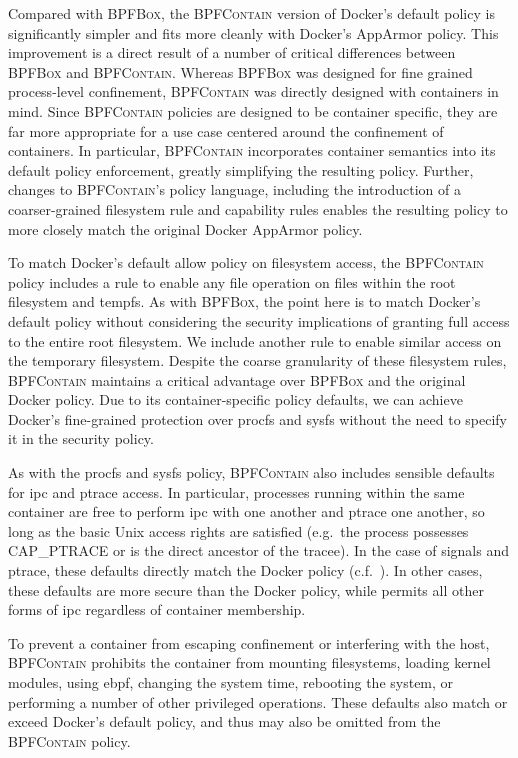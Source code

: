 \documentclass[
  fontsize=12pt,
  titlepage=firstiscover,
  paper=letter,
oneside,
  cleardoublepage=plain,
  parskip=half-,
  DIV=10,
  parindent,
  appendixprefix,
  chapterprefix,
  listof=totoc,
]{scrbook}
\newcommand{\bpfbox}{\textsc{BPFBox}}
\newcommand{\bpfcontain}{\textsc{BPFContain}}
\begin{document}
Compared with \bpfbox{}, the \bpfcontain{} version of Docker's default policy is
significantly simpler and fits more cleanly with Docker's AppArmor policy. This
improvement is a direct result of a number of critical differences between \bpfbox{} and
\bpfcontain{}. Whereas \bpfbox{} was designed for fine grained process-level confinement,
\bpfcontain{} was directly designed with containers in mind. Since \bpfcontain{} policies
are designed to be container specific, they are far more appropriate for a use case
centered around the confinement of containers. In particular, \bpfcontain{} incorporates
container semantics into its default policy enforcement, greatly simplifying the resulting
policy.  Further, changes to \bpfcontain{}'s policy language, including the introduction
of a coarser-grained filesystem rule and capability rules enables the resulting policy to
more closely match the original Docker AppArmor policy.

To match Docker's default allow policy on filesystem access, the \bpfcontain{} policy
includes a rule to enable any file operation on files within the root filesystem and
tempfs.  As with \bpfbox{}, the point here is to match Docker's default policy without
considering the security implications of granting full access to the entire root
filesystem. We include another rule to enable similar access on the temporary filesystem.
Despite the coarse granularity of these filesystem rules, \bpfcontain{} maintains
a critical advantage over \bpfbox{} and the original Docker policy. Due to its
container-specific policy defaults, we can achieve Docker's fine-grained protection over
procfs and sysfs without the need to specify it in the security policy.

As with the procfs and sysfs policy, \bpfcontain{} also includes sensible defaults for
\gls{ipc} and ptrace access. In particular, processes running within the same container
are free to perform \gls{ipc} with one another and ptrace one another, so long as the
basic Unix access rights are satisfied (e.g.\ the process possesses CAP\_PTRACE or is the
direct ancestor of the tracee). In the case of signals and ptrace, these defaults directly
match the Docker policy (c.f.\ ).  In other cases, these defaults
are more secure than the Docker policy, while permits all other forms of \gls{ipc}
regardless of container membership.

To prevent a container from escaping confinement or interfering with the host,
\bpfcontain{} prohibits the container from mounting filesystems, loading kernel modules,
using \gls{ebpf}, changing the system time, rebooting the system, or performing a number
of other privileged operations. These defaults also match or exceed Docker's default
policy, and thus may also be omitted from the \bpfcontain{} policy.
\end{document}
